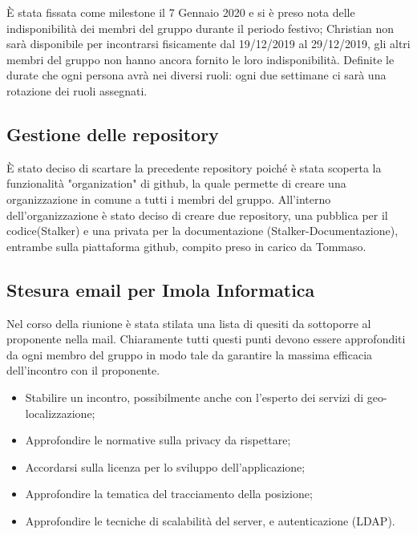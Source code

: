È stata fissata come milestone il 7 Gennaio 2020 e si è preso nota delle indisponibilità dei membri del gruppo durante il periodo festivo; Christian non sarà disponibile per incontrarsi fisicamente dal 19/12/2019 al 29/12/2019, gli altri membri del gruppo non hanno ancora fornito le loro indisponibilità. 
Definite le durate che ogni persona avrà nei diversi ruoli: ogni due settimane ci sarà una rotazione dei ruoli assegnati. 

\subsection{Gestione delle repository}
È stato deciso di scartare la precedente repository poiché è stata scoperta la funzionalità "organization" di github, la quale permette di creare una organizzazione in comune a tutti i membri del gruppo.
All'interno dell'organizzazione è stato deciso di creare due repository, una pubblica per il codice(Stalker) e una privata per la documentazione (Stalker-Documentazione), entrambe sulla piattaforma github, compito preso in carico da Tommaso. 

\subsection{Stesura email per Imola Informatica}
Nel corso della riunione è stata stilata una lista di quesiti da sottoporre al proponente nella mail. 
Chiaramente tutti questi punti devono essere approfonditi da ogni membro del gruppo in modo tale da garantire la massima efficacia dell'incontro con il proponente.
\begin{itemize}
\item Stabilire un incontro, possibilmente anche con l'esperto dei servizi di geo-localizzazione;
\item Approfondire le normative sulla privacy da rispettare;
\item Accordarsi sulla licenza per lo sviluppo dell'applicazione;
\item Approfondire la tematica del tracciamento della posizione;
\item Approfondire le tecniche di scalabilità del server, e autenticazione (LDAP).
\end{itemize} 

